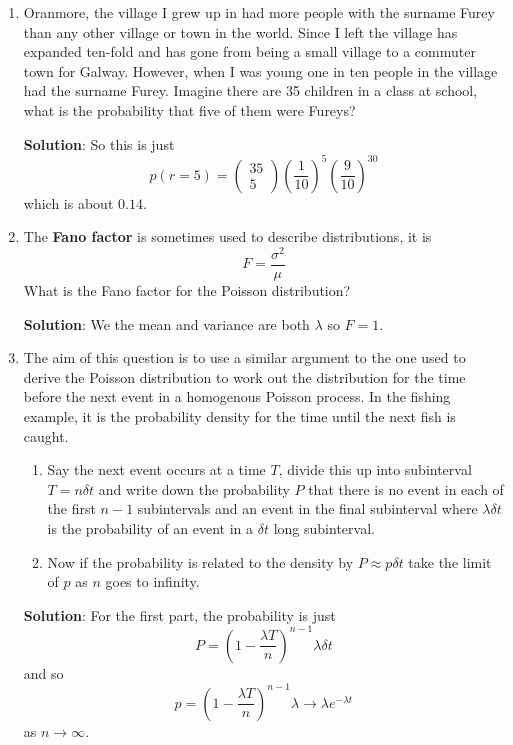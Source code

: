\documentclass[11pt,a4paper]{scrartcl}
\begin{document}
\begin{enumerate}

\item Oranmore, the village I grew up in had more people with the
  surname Furey than any other village or town in the world. Since I
  left the village has expanded ten-fold and has gone from being a
  small village to a commuter town for Galway. However, when I was young
  one in ten people in the village had the surname Furey. Imagine
  there are 35 children in a class at school, what is the probability
  that five of them were Fureys?

  \textbf{Solution}: So this is just
  \begin{equation}
    p(r=5)=\left(\begin{array}{c}35\\5\end{array}\right) \left(\frac{1}{10}\right)^{5}\left(\frac{9}{10}\right)^{30}
\end{equation}
which is about $0.14$.
  
\item The \textbf{Fano factor} is sometimes used to describe distributions, it is
  \begin{equation}
    F=\frac{\sigma^2}{\mu}
  \end{equation}
What is the Fano factor for the Poisson distribution?

  \textbf{Solution}: We the mean and variance are both $\lambda$ so $F=1$.

\item The aim of this question is to use a similar argument to the one
  used to derive the Poisson distribution to work out the distribution
  for the time before the next event in a homogenous Poisson
  process. In the fishing example, it is the probability density for
  the time until the next fish is caught.
  \begin{enumerate}
    \item Say the next event occurs at a time $T$, divide this up into
      subinterval $T=n\delta t$ and write down the probability $P$ that
      there is no event in each of the first $n-1$ subintervals and an
      event in the final subinterval where $\lambda\delta t$ is the
      probability of an event in a $\delta t$ long subinterval.
    \item Now if the probability is related to the density by $P\approx p\delta t$ take the limit of $p$ as $n$ goes to infinity.
      \end{enumerate}

  \textbf{Solution}: For the first part, the probability is just
  \begin{equation}
    P=\left(1-\frac{\lambda T}{n}\right)^{n-1}\lambda \delta t
  \end{equation}
and so   
    \begin{equation}
    p=\left(1-\frac{\lambda T}{n}\right)^{n-1}\lambda \rightarrow \lambda e^{-\lambda t}
    \end{equation}
    as $n\rightarrow \infty$.
\end{enumerate}
\end{document}
